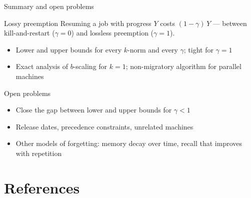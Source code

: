 \documentclass[aspectratio=169,11pt]{beamer}
\begin{document}
\begin{frame}{Summary and open problems}
  \begin{block}{Lossy preemption}
    Resuming a job with progress $Y$ costs $(1-\gamma)\,Y$ ---
    between kill-and-restart ($\gamma=0$) and lossless preemption ($\gamma=1$).
  \end{block}
  \begin{itemize}
    \item Lower and upper bounds for every $k$-norm and every $\gamma$; tight for $\gamma = 1$
    \item Exact analysis of $b$-scaling for $k=1$; non-migratory algorithm for parallel machines
  \end{itemize}
  \vfill
  \begin{exampleblock}{Open problems}
    \begin{itemize}
      \item Close the gap between lower and upper bounds for $\gamma < 1$
      \item Release dates, precedence constraints, unrelated machines
      \item Other models of forgetting: memory decay over time, recall that improves with repetition
    \end{itemize}
  \end{exampleblock}
\end{frame}

\appendix   %
\section*{References}
\end{document}

